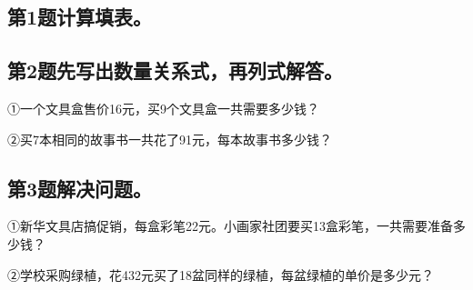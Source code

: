 \subsection*{第1题\quad 计算填表。}
\subsection*{第2题\quad 先写出数量关系式，再列式解答。}
\noindent ①一个文具盒售价16元，买9个文具盒一共需要多少钱？\par
{}
\noindent ②买7本相同的故事书一共花了91元，每本故事书多少钱？\par
{}
\subsection*{第3题\quad 解决问题。}
\noindent ①新华文具店搞促销，每盒彩笔22元。小画家社团要买13盒彩笔，一共需要准备多少钱？\par
{}
\noindent ②学校采购绿植，花432元买了18盆同样的绿植，每盆绿植的单价是多少元？\par
{}
